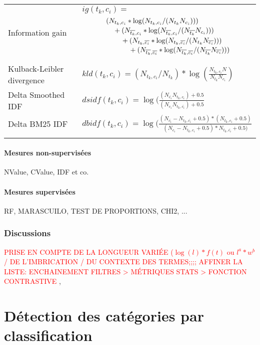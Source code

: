 \begin{table}
\begin{tabular}{p{}@{\hskip 0.2in}p{}}
		Information gain & $ig(t_k, c_i) = $ \begin{equation*}
		\splitdfrac{\splitdfrac{\splitdfrac{(N_{t_k,c_i} * \log (N_{t_k,c_i} / (N_{t_k}N_{c_i})))}
				{+ (N_{\overline{t_k},c_i} * \log (N_{\overline{t_k},c_i} / (N_{\overline{t_k}}N_{c_i})))}}
			{+ (N_{t_k,\overline{c_i}} * \log (N_{t_k,\overline{c_i}} / (N_{t_k}N_{\overline{c_i}})))}}
		{+ (N_{\overline{t_k},\overline{c_i}} * \log (N_{\overline{t_k},\overline{c_i}} / (N_{\overline{t_k}}N_{\overline{c_i}})))}
		\end{equation*} \\ \noalign{\smallskip}
		Kulback-Leibler divergence & $kld(t_k, c_i)=(N_{t_k,c_i} / N_{t_k}) * \log (\frac{N_{t_k,c_i} N}{N_{t_k}N_{c_i}})$\\ \noalign{\smallskip}
		Delta Smoothed IDF & $dsidf(t_k, c_i)=\log (\frac{(N_{\overline{c_i}}N_{t_k,c_i}) + 0.5}{(N_{c_i}N_{t_k,\overline{c_i}}) + 0.5} $\\ \noalign{\smallskip}
		Delta BM25 IDF \cite{jones2000bm25idf} & $dbidf(t_k, c_i) = \log (\frac{(N_{\overline{c_i}} - N_{t_k,\overline{c_i}} + 0.5) * (N_{t_k,c_i} + 0.5)}{(N_{c_i} - N_{t_k,c_i} + 0.5) * N_{t_k,\overline{c_i}} + 0.5)} $\\ \noalign{\smallskip}
		\hline
	\end{tabular}
\end{table}
\paragraph{Mesures non-supervisées}
NValue, CValue, IDF et co.
\paragraph{Mesures supervisées}
RF, MARASCUILO, TEST DE PROPORTIONS, CHI2, ...
\subsubsection{Discussions}
\textcolor{red}{PRISE EN COMPTE DE LA LONGUEUR VARIÉE ($\log(l) * f(t)$ ou $l^a * w^b$ / DE L'IMBRICATION / DU CONTEXTE DES TERMES;;;; AFFINER LA LISTE: ENCHAINEMENT FILTRES > MÉTRIQUES STATS > FONCTION CONTRASTIVE}
\cite{LossioVentura2014biotex}, \cite{Bonin2010multiwordncvalue}


\section{Détection des catégories par classification}

